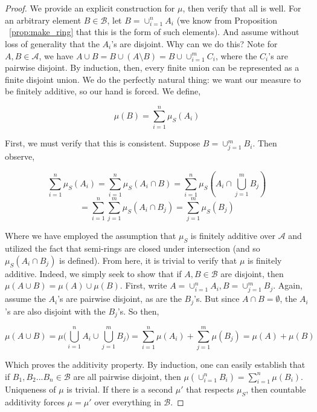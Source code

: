 \begin{proof}
   We provide an explicit construction for $\mu$, then verify that 
   all is well. For an arbitrary element $B \in \mathcal B$, let $B = \cup_{i=1}^n A_i$ 
   (we know from Proposition ~\ref{prop:make_ring} that this is the form of such elements). 
   And assume without loss of generality that the $A_i$'s are disjoint. Why can we do this? 
   Note for $A,B \in \mathcal A$, we have $A \cup B = B \cup (A \setminus B) = B \cup \cup_{i=1}^m C_i$, 
   where the $C_i$'s are pairwise disjoint. By induction, then, every finite union can be represented 
   as a finite disjoint union. We do the perfectly natural thing: we want our measure to be 
   finitely additive, so our hand is forced. We define,
   
   \[ \mu(B) = \sum_{i=1}^n \mu_S(A_i) \]

   First, we must verify that this is consistent. Suppose $B = \cup_{j=1}^m B_i$. Then observe, 

   \[ \sum_{i=1}^n \mu_S(A_i) = \sum_{i=1}^n \mu_S(A_i \cap B) = \sum_{i=1}^n \mu_S(A_i \cap \bigcup_{j=1}^m B_j)  \]
   \[ = \sum_{i=1}^n \sum_{j=1}^m \mu_S(A_i \cap B_j) = \sum_{j=1}^m \mu_S(B_j) \]

   Where we have employed the assumption that $\mu_S$ is finitely additive over 
   $\mathcal A$ and utilized the fact that semi-rings are closed under intersection 
   (and so $\mu_S(A_i \cap B_j)$ is defined). From here, it is trivial to verify that 
   $\mu$ is finitely additive. Indeed, we simply seek to show that if 
   $A,B \in \mathcal B$ are disjoint, then $\mu(A \cup B) = \mu(A) \cup \mu(B)$. 
   First, write $A = \cup_{i=1}^n A_i, B = \cup_{j=1}^m B_j$. Again, assume the 
   $A_i$'s are pairwise disjoint, as are the $B_j$'s. But since $A \cap B  = 
   \emptyset$, the $A_i$'s are also disjoint with the $B_j$'s. So then, 

   \[ \mu(A \cup B) = \mu\bigg( \bigcup_{i=1}^n A_i \cup \bigcup_{j=1}^m B_j \bigg) = \sum_{i=1}^n \mu(A_i) + \sum_{j=1}^m \mu(B_j) = \mu(A) + \mu(B) \]

   Which proves the additivity property. By induction, one can easily establish that if 
   $B_1,B_2...B_n \in \mathcal B$ are all pairwise disjoint, then $\mu(\cup_{i=1}^n B_i) = \sum_{i=1}^n \mu(B_i)$. \\

   Uniqueness of $\mu$ is trivial. If there is a second $\mu'$ that respects $\mu_S$, then countable 
   additivity forces $\mu = \mu'$ over everything in $\mathcal B$.

\end{proof}


